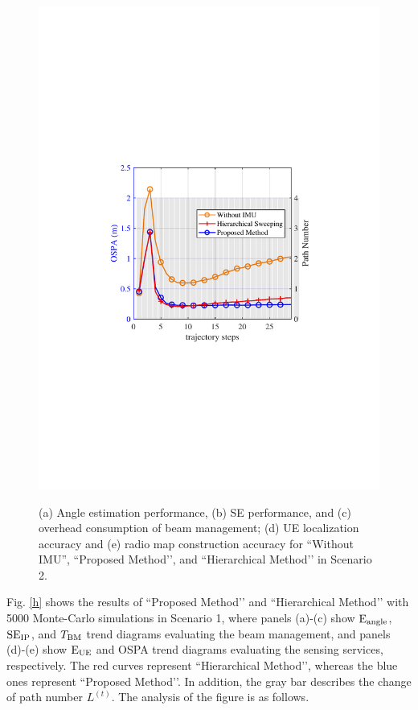 \documentclass[journal,12pt,onecolumn,draftclsnofoot,]{IEEEtran}
\begin{document}
\begin{figure}
{\hspace{-0mm}\includegraphics[scale=0.46]{9-5.pdf}\hspace{-0mm}
}
\caption{
(a) Angle estimation performance, (b) SE performance, and (c) overhead consumption of beam management; (d) UE localization accuracy and (e) radio map construction accuracy for ``Without IMU'', ``Proposed Method’’, and ``Hierarchical Method’’ in Scenario 2.
}
\label{i}
\vspace{-10mm}
\end{figure}


Fig. \ref{h} shows the results of ``Proposed Method’’ and ``Hierarchical Method’’ with 5000 Monte-Carlo simulations in Scenario 1, where panels (a)-(c) show ${{\rm{E}}_{{\rm{angle}}}}$, ${\rm{S}}{{\rm{E}}_{{\rm{IP}}}}$, and ${{{T}}_{{\rm{BM}}}}$ trend diagrams evaluating the beam management, and panels (d)-(e) show ${{\rm{E}}_{{\rm{UE}}}}$ and OSPA trend diagrams evaluating the sensing services, respectively.
The red curves represent ``Hierarchical Method’’, whereas the blue ones represent ``Proposed Method’’. In addition, the gray bar describes the change of path number $L^{(t)}$. 
The analysis of the figure is as follows. 
\end{document}
